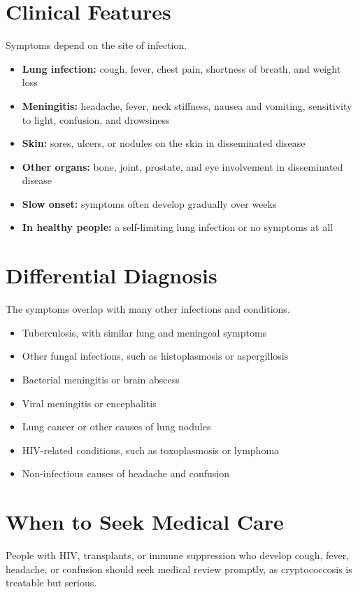 \section*{Clinical Features}
Symptoms depend on the site of infection.

\begin{itemize}
    \item \textbf{Lung infection:} cough, fever, chest pain, shortness of breath, and weight loss
    \item \textbf{Meningitis:} headache, fever, neck stiffness, nausea and vomiting, sensitivity to light, confusion, and drowsiness
    \item \textbf{Skin:} sores, ulcers, or nodules on the skin in disseminated disease
    \item \textbf{Other organs:} bone, joint, prostate, and eye involvement in disseminated disease
    \item \textbf{Slow onset:} symptoms often develop gradually over weeks
    \item \textbf{In healthy people:} a self-limiting lung infection or no symptoms at all
\end{itemize}

\section*{Differential Diagnosis}
The symptoms overlap with many other infections and conditions.

\begin{itemize}
    \item Tuberculosis, with similar lung and meningeal symptoms
    \item Other fungal infections, such as histoplasmosis or aspergillosis
    \item Bacterial meningitis or brain abscess
    \item Viral meningitis or encephalitis
    \item Lung cancer or other causes of lung nodules
    \item HIV-related conditions, such as toxoplasmosis or lymphoma
    \item Non-infectious causes of headache and confusion
\end{itemize}

\section*{When to Seek Medical Care}
People with HIV, transplants, or immune suppression who develop cough, fever, headache, or confusion should seek medical review promptly, as cryptococcosis is treatable but serious.

